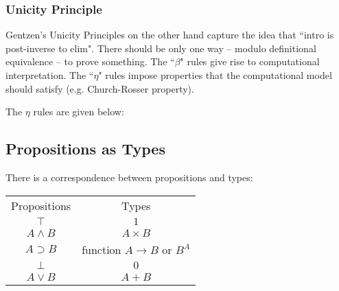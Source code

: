 \subsubsection{Unicity Principle}

Gentzen's Unicity Principles on the other hand capture the idea that ``intro is post-inverse to elim". 	There should be only one way -- modulo definitional equivalence -- to prove something. The ``$\beta$" rules give rise to computational interpretation. The ``$\eta$" rules impose properties that the computational model should satisfy (e.g. Church-Rosser property).

The $\eta$ rules are given below:

\begin{mdframed}
\end{mdframed}





\subsection{Propositions as Types}



There is a correspondence between propositions and types:
\begin{center}
  \begin{tabular}{@{} cc @{}}

    Propositions & Types \\

    $\top$ & $1$ \\
    $A\wedge B$ & $A\times B$ \\
    $A\supset B$ & function $A\to B$ or $B^A$ \\
    $\bot$ & $0$ \\
    $A\vee B$ & $A+B$\\

  \end{tabular}
\end{center}



